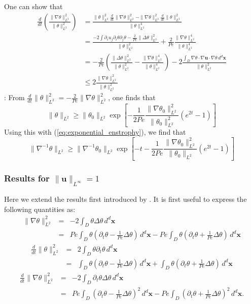 \documentclass[12pt]{iopart}
\newcommand{\ddt}[1]{\frac{d #1}{dt}}
\newcommand{\hmone}[1]{\|\nabla^{-1} #1\|_{L^{2}}}
\newcommand{\ltwo}[1]{\|#1\|_{L^{2}}}
\newcommand{\hone}[1]{\| \nabla #1\|_{L^{2}}}
\newcommand{\sint}[1]{\int_{D} #1 \, d^{d}\mathbf{x}}
\renewcommand{\vec}[1]{\mathbf{#1}}
\newcommand{\linf}[1]{\| #1 \|_{L^{\infty}}}
\renewcommand{\u}{\mathbf{u}}
\newcommand{\ppt}[1]{\partial_{t} #1}
\newcommand{\lap}{\Delta }
\begin{document}
One can show that 
%
\numparts \begin{eqnarray}
\frac{d}{dt}\left(\frac{\|\nabla\theta\|_{L^{2}}^2}{\|\theta\|_{L^{2}}^2}\right) &= \frac{\|\theta\|_{L^{2}}^2\frac{d}{dt}\|\nabla\theta\|_{L^{2}}^2-\|\nabla\theta\|_{L^{2}}^2\frac{d}{dt}\|\theta\|_{L^{2}}^2}{\|\theta\|_{L^{2}}^4}\\
&= \frac{-2\int \partial_{i}u_{j}\partial_{i}\theta\partial_{j}\theta - \frac{2}{Pe} \|\Delta\theta\|_{L^{2}}^2}{\|\theta\|_{L^{2}}^2}+\frac{2}{Pe}\frac{\|\nabla\theta\|_{L^{2}}^4}{\|\theta\|_{L^{2}}^4} \\
&=-\frac{2}{Pe}\left(\frac{\|\Delta\theta\|_{L^{2}}^2}{\|\theta\|_{L^{2}}^2} - \frac{\|\nabla\theta\|_{L^{2}}^4}{\|\theta\|_{L^{2}}^4} \right) - 2\frac{\sint{\nabla\theta \cdot \nabla\vec{u} \cdot 
							\nabla\theta  }}{\|\theta\|_{L^{2}}^2} 
\\
&\leq 2 \frac{\hone{\theta}^2}{\ltwo{\theta}^2}
\end{eqnarray} \endnumparts:
%
From $\ddt{}\ltwo{\theta}^2 = -\frac{2}{Pe} \hone{\theta}^2$, one finds that 
\begin{equation}
\ltwo{\theta}\geq  \ltwo{\theta_{0}}\exp\left[-\frac{1}{2Pe}\frac{\hone{\theta_{0}}^2}{\ltwo{\theta_{0}}^2}\left(e^{2 t} -1\right)\right]
\end{equation}
Using this with (\ref{eq:exponential_enstrophy}), we find that 
\begin{equation}
\hmone{\theta} \geq  \hmone{\theta_{0}} \exp\left[- t -\frac{1}{2 Pe}\frac{\hone{\theta_{0}}^2}{\ltwo{\theta_{0}}}\left(e^{2 t} -1\right)\right]
\end{equation}

\subsubsection{Results for $\linf{\u}= 1$}
Here we extend the results first introduced by \cite{Chi-Cheu1996}.  It is first useful to express the following quantities as:
%
\begin{eqnarray}
	 \hone{\theta}^2 &=& - 2\sint{\theta \lap \theta} \\
	 							&=& Pe \sint{\theta\left(\ppt{\theta}
	 									-\frac{1}{Pe}\lap \theta\right)} 
	 									-Pe \sint{\theta\left(\ppt{\theta}
	 									+\frac{1}{Pe}\lap \theta\right)} 
\end{eqnarray}
%
\begin{eqnarray}
	\ddt{}\ltwo{\theta}^2 &=& 2\sint{\theta\ppt{\theta}} \\
										 &=&\sint{\theta\left(\ppt{\theta}
	 									-\frac{1}{Pe}\lap \theta\right)} 
										 + \sint{\theta\left(\ppt{\theta}
	 									+\frac{1}{Pe}\lap \theta\right)} 
\end{eqnarray}
%
\begin{eqnarray}
	\ddt{}\hone{\theta}^2 &=& -2\sint{\ppt{\theta}\lap \theta} \\
	 									&=& Pe \sint{\left(\ppt{\theta}
	 									-\frac{1}{Pe}\lap \theta\right)^2} 
	 									-Pe \sint{\left(\ppt{\theta}
	 									+\frac{1}{Pe}\lap \theta\right)^2} .
\end{eqnarray}
\end{document}
